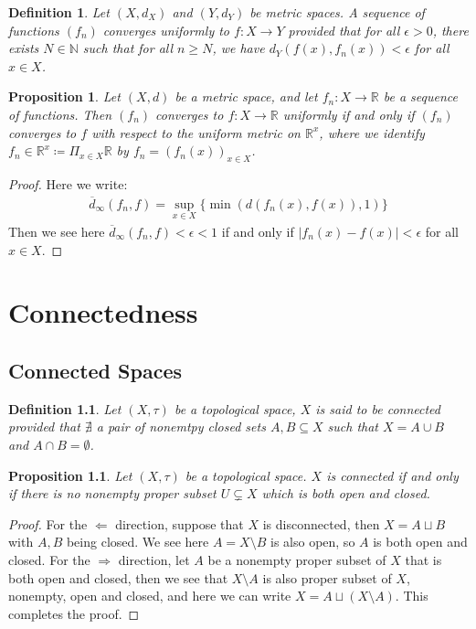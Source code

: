 \documentclass[11pt]{book}
\theoremstyle{break}
\theoremstyle{break}
\newtheorem{prop}[lem]{Proposition}
\newtheorem{defn}{Definition}[corL]
\newcommand{\R}{\mathbb{R}}
\newcommand{\N}{\mathbb{N}}
\begin{document}
\begin{defn}
Let $(X,d_X)$ and $(Y,d_Y)$ be metric spaces. A sequence of functions $(f_n)$ converges uniformly to $f:X \to Y$ provided that for all $\epsilon>0$, there exists $N \in \N$ such that for all $n \geq N$, we have $d_Y(f(x),f_n(x))<\epsilon$ for all $x \in X$.
\end{defn}

\begin{prop}
Let $(X,d)$ be a metric space, and let $f_n:X \to \R$ be a sequence of functions. Then $(f_n)$ converges to $f:X \to \R$ uniformly if and only if $(f_n)$ converges to $f$ with respect to the uniform metric on $\R^x$, where we identify $f_n \in \R^x \coloneqq \Pi_{x \in X}\R$ by $f_n = (f_n(x))_{x \in X}$.  
\end{prop}
\begin{proof}
Here we write:
\begin{align*}
\overline{d}_{\infty}(f_n,f) = \sup_{x \in X}\{ \min(d(f_n(x),f(x)),1)\}
\end{align*}
Then we see here $\overline{d}_{\infty}(f_n,f) < \epsilon<1$ if and only if $|f_n(x) - f(x)|<\epsilon$ for all $x \in X$. 
\end{proof}


\chapter{Connectedness}
\setcounter{section}{10}
\section[Connected Spaces]{\color{red}Connected Spaces\color{black}}
\begin{defn}
Let $(X,\tau)$ be a topological space, $X$ is said to be connected provided that $\nexists$ a pair of nonemtpy closed sets $A,B \subseteq X$ such that $X = A\cup B$ and $A\cap B = \emptyset$.
\end{defn}

\begin{prop}
Let $(X,\tau)$ be a topological space. $X$ is connected if and only if there is no nonempty proper subset $U \subsetneq X$ which is both open and closed.
\end{prop}
\begin{proof}
For the $\Leftarrow$ direction, suppose that $X$ is disconnected, then $X = A\sqcup B$ with $A,B$ being closed. We see here $A = X\setminus B$ is also open, so $A$ is both open and closed. For the $\Rightarrow$ direction, let $A $ be a nonempty proper subset of $X$ that is both open and closed, then we see that $X \setminus A$ is also proper subset of $X$, nonempty, open and closed, and here we can write $X = A\sqcup (X\setminus A)$. This completes the proof.
\end{proof}
\end{document}
